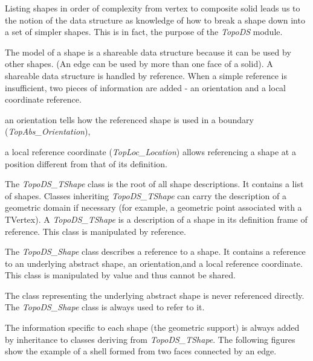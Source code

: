 Listing shapes in order of complexity from vertex to composite solid leads us to the notion of the data structure as knowledge of how to break a shape down into a set of simpler shapes. This is in fact, the purpose of the {\itshape Topo\+DS} module.

The model of a shape is a shareable data structure because it can be used by other shapes. (An edge can be used by more than one face of a solid). A shareable data structure is handled by reference. When a simple reference is insufficient, two pieces of information are added -\/ an orientation and a local coordinate reference.
\begin{DoxyItemize}
\item an orientation tells how the referenced shape is used in a boundary ({\itshape Top\+Abs\+\_\+\+Orientation}),
\item a local reference coordinate ({\itshape Top\+Loc\+\_\+\+Location}) allows referencing a shape at a position different from that of its definition.
\end{DoxyItemize}

The {\itshape Topo\+D\+S\+\_\+\+T\+Shape} class is the root of all shape descriptions. It contains a list of shapes. Classes inheriting {\itshape Topo\+D\+S\+\_\+\+T\+Shape} can carry the description of a geometric domain if necessary (for example, a geometric point associated with a T\+Vertex). A {\itshape Topo\+D\+S\+\_\+\+T\+Shape} is a description of a shape in its definition frame of reference. This class is manipulated by reference.

The {\itshape Topo\+D\+S\+\_\+\+Shape} class describes a reference to a shape. It contains a reference to an underlying abstract shape, an orientation,and a local reference coordinate. This class is manipulated by value and thus cannot be shared.

The class representing the underlying abstract shape is never referenced directly. The {\itshape Topo\+D\+S\+\_\+\+Shape} class is always used to refer to it.

The information specific to each shape (the geometric support) is always added by inheritance to classes deriving from {\itshape Topo\+D\+S\+\_\+\+T\+Shape}. The following figures show the example of a shell formed from two faces connected by an edge.


